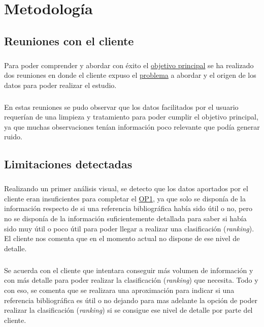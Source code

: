 \chapter{Metodología}
\label{chapter:metodologia}


\section{Reuniones con el cliente}

\paragraph{}
Para poder comprender y abordar con éxito el \hyperref[op:OP1]{objetivo principal} se ha realizado dos reuniones en donde el cliente expuso el \hyperref[op:OP1]{problema} a abordar y el origen de los datos para poder realizar el estudio.

\paragraph{}
En estas reuniones se pudo observar que los datos facilitados por el usuario requerían de una limpieza y tratamiento para poder cumplir el objetivo principal, ya que muchas observaciones tenían información poco relevante que podía generar ruido.

\section{Limitaciones detectadas}

\paragraph{}
Realizando un primer análisis visual, se detecto que los datos aportados por el cliente eran insuficientes para completar el \hyperref[op:OP1]{OP1}, ya que solo se disponía de la información respecto de si una referencia bibliográfica había sido útil o no, pero no se disponía de la información suficientemente detallada para saber si había sido muy útil o poco útil para poder llegar a realizar una clasificación (\textit{ranking}). El cliente nos comenta que en el momento actual no dispone de ese nivel de detalle.

\paragraph{}
Se acuerda con el cliente que intentara conseguir más volumen de información y con más detalle para poder realizar la clasificación (\textit{ranking}) que necesita. Todo y con eso, se comenta que se realizara una aproximación para indicar si una referencia bibliográfica es útil o no dejando para mas adelante la opción de poder realizar la clasificación (\textit{ranking}) si se consigue ese nivel de detalle por parte del cliente.

